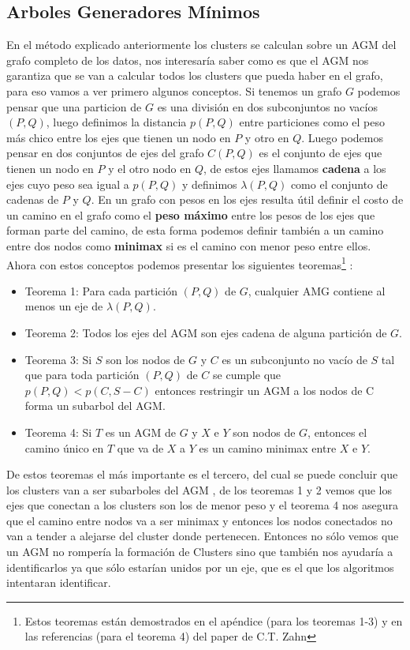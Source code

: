 \documentclass[11pt,a4paper]{article}
\begin{document}
\subsection{Arboles Generadores Mínimos}
En el método explicado anteriormente los clusters se calculan sobre un AGM del grafo completo de los datos, nos interesaría saber como es que el AGM nos garantiza que se van a calcular todos los clusters que pueda haber en el grafo, para eso vamos a ver primero algunos conceptos.
Si tenemos un grafo $G$ podemos pensar que una particion de $G$ es una división en dos subconjuntos no vacíos $(P, Q)$, luego definimos la distancia $p(P, Q)$ entre particiones como el peso más chico entre los ejes que tienen un nodo en $P$ y otro en $Q$. Luego podemos pensar en dos conjuntos de ejes del grafo $C(P, Q)$ es el conjunto de ejes que tienen un nodo en $P$ y el otro nodo en $Q$, de estos ejes llamamos \textbf{cadena} a los ejes cuyo peso sea igual a $p(P, Q)$ y definimos $\lambda(P, Q)$ como el conjunto de cadenas de $P$ y $Q$.
En un grafo con pesos en los ejes resulta útil definir el costo de un camino en el grafo como el \textbf{peso máximo} entre los pesos de los ejes que forman parte del camino, de esta forma podemos definir también a un camino entre dos nodos como \textbf{minimax} si es el camino con menor peso entre ellos.
Ahora con estos conceptos podemos presentar los siguientes teoremas\footnote{Estos teoremas están demostrados en el apéndice (para los teoremas 1-3) y en las referencias (para el teorema 4) del paper de C.T. Zahn} :
\begin{itemize}
	\item Teorema 1: Para cada partición $(P, Q)$ de $G$, cualquier AMG contiene al menos un eje de $\lambda(P, Q)$.
	\item Teorema 2: Todos los ejes del AGM son ejes cadena de alguna partición de $G$.
	\item Teorema 3: Si $S$ son los nodos de $G$ y $C$ es un subconjunto no vacío de $S$ tal que para toda partición $(P, Q)$ de $C$ se cumple que $p(P, Q) < p(C, S-C)$ entonces restringir un AGM a los nodos de C forma un subarbol del AGM.
	\item Teorema 4: Si $T$ es un AGM de $G$ y $X$ e $Y$ son nodos de $G$, entonces el camino único en $T$ que va de $X$ a $Y$ es un camino minimax entre $X$ e $Y$.
\end{itemize}

De estos teoremas el más importante es el tercero, del cual se puede concluir que los clusters van a ser subarboles del AGM , de los teoremas 1 y 2 vemos que los ejes que conectan a los clusters son los de menor peso y el teorema 4 nos asegura que el camino entre nodos va a ser minimax y entonces los nodos conectados no van a tender a alejarse del cluster donde pertenecen.
Entonces no sólo vemos que un AGM no rompería la formación de Clusters sino que también nos ayudaría a identificarlos ya que sólo estarían unidos por un eje, que es el que los algoritmos intentaran identificar.
\end{document}
